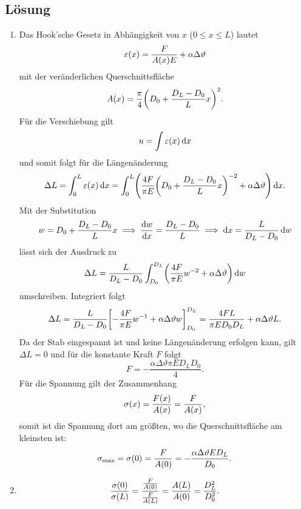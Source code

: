 \documentclass{exercise}
\begin{document}
    \subsection*{Lösung}
    \begin{enumerate}
        \item Das Hook'sche Gesetz in Abhängigkeit von \(x\) (\(0 \le x \le L\)) lautet
        \[
            \varepsilon\parentheses*{x} = \frac{F}{A\parentheses*{x}E} + \alpha\Delta\vartheta
        \]
        mit der veränderlichen Querschnittsfläche
        \[
            A\parentheses*{x} = \frac{\pi}{4}\parentheses*{D_0 + \frac{D_L - D_0}{L}x}^2.
        \]
        Für die Verschiebung gilt
        \[
            u = \int\varepsilon\parentheses*{x}\d x
        \]
        und somit folgt für die Längenänderung
        \[
            \Delta L = \int_0^L \varepsilon\parentheses*{x}\d x = \int_0^L \parentheses*{\frac{4F}{\pi E}\parentheses*{D_0 + \frac{D_L - D_0}{L}x}^{-2} + \alpha\Delta\vartheta}\d x.
        \]
        Mit der Substitution
        \[
            w = D_0 + \frac{D_L - D_0}{L}x \implies \frac{\mathop{\mathrm{d}\!} w}{\mathop{\mathrm{d}\!} x} = \frac{D_L - D_0}{L} \implies \mathop{\mathrm{d}\!} x = \frac{L}{D_L - D_0}\mathop{\mathrm{d}\!} w
        \]
        lässt sich der Ausdruck zu
        \[
            \Delta L = \frac{L}{D_L - D_0}\int_{D_0}^{D_L}\parentheses*{\frac{4F}{\pi E}w^{-2} + \alpha\Delta\vartheta}\d w
        \]
        umschreiben.
        Integriert folgt
        \[
            \Delta L = \frac{L}{D_L - D_0}\brackets*{-\frac{4F}{\pi E}w^{-1} + \alpha\Delta\vartheta w}_{D_0}^{D_L} = \frac{4FL}{\pi ED_0 D_L} + \alpha\Delta\vartheta L.
        \]
        Da der Stab eingespannt ist und keine Längenänderung erfolgen kann, gilt \(\Delta L = 0\) und für die konstante Kraft \(F\) folgt
        \[
            F = -\frac{\alpha\Delta\vartheta\pi ED_L D_0}{4}.
        \]
        Für die Spannung gilt der Zusammenhang
        \[
            \sigma\parentheses*{x} = \frac{F\parentheses*{x}}{A\parentheses*{x}} = \frac{F}{A\parentheses*{x}},
        \]
        somit ist die Spannung dort am größten, wo die Querschnittsfläche am kleinsten ist:
        \[
            \sigma_{\text{max}} = \sigma\parentheses*{0} = \frac{F}{A\parentheses*{0}} = -\frac{\alpha\Delta\vartheta ED_L}{D_0}.
        \]
        \item
        \[
            \frac{\sigma\parentheses*{0}}{\sigma\parentheses*{L}} = \frac{\frac{F}{A\parentheses*{0}}}{\frac{F}{A\parentheses*{L}}} = \frac{A\parentheses*{L}}{A\parentheses*{0}} = \frac{D_L^2}{D_0^2}.
        \]
    \end{enumerate}
\end{document}
